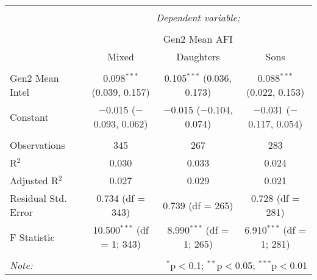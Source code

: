
\begingroup 
\small 
\begin{tabular}{@{\extracolsep{1pt}}lccc} 
\\[-1.8ex]\hline 
\hline \\[-1.8ex] 
 & \multicolumn{3}{c}{\textit{Dependent variable:}} \\ 
\cline{2-4} 
\\[-1.8ex] & \multicolumn{3}{c}{Gen2 Mean AFI} \\ 
 & Mixed & Daughters & Sons \\ 
\hline \\[-1.8ex] 
 Gen2 Mean Intel & 0.098$^{***}$ (0.039, 0.157) & 0.105$^{***}$ (0.036, 0.173) & 0.088$^{***}$ (0.022, 0.153) \\ 
  Constant & $-$0.015 ($-$0.093, 0.062) & $-$0.015 ($-$0.104, 0.074) & $-$0.031 ($-$0.117, 0.054) \\ 
 \hline \\[-1.8ex] 
Observations & 345 & 267 & 283 \\ 
R$^{2}$ & 0.030 & 0.033 & 0.024 \\ 
Adjusted R$^{2}$ & 0.027 & 0.029 & 0.021 \\ 
Residual Std. Error & 0.734 (df = 343) & 0.739 (df = 265) & 0.728 (df = 281) \\ 
F Statistic & 10.500$^{***}$ (df = 1; 343) & 8.990$^{***}$ (df = 1; 265) & 6.910$^{***}$ (df = 1; 281) \\ 
\hline 
\hline \\[-1.8ex] 
\textit{Note:}  & \multicolumn{3}{r}{$^{*}$p$<$0.1; $^{**}$p$<$0.05; $^{***}$p$<$0.01} \\ 
\end{tabular} 
\endgroup 
